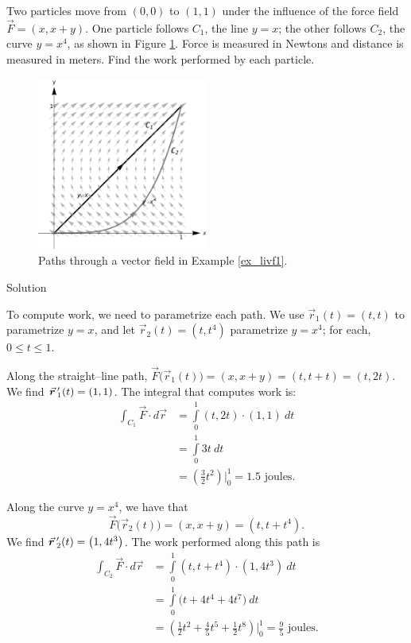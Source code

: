 \begin{example}\label{ex_livf1}
Two particles move from $(0,0)$ to $(1,1)$ under the influence of the force field $\vec F  = \left( x, x+y\right)$. One particle follows $C_1$, the line $y=x$; the other follows $C_2$, the curve $y=x^4$, as shown in Figure \ref{fig_Vector_Calc_8}. Force is measured in Newtons and distance is measured in meters. Find the work performed by each particle.


\begin{figure}[H]
	\begin{center}
			\includegraphics[width=0.5\textwidth]{fig_Vector_Calc_8}
	\caption{Paths through a vector field in Example \ref{ex_livf1}.}
	\label{fig_Vector_Calc_8}
	\end{center}
\end{figure}


Solution 

To compute work, we need to parametrize each path. We use $\vec r_1(t) = \left( t,t\right)$ to parametrize $y=x$, and let $\vec r_2(t) =\left( t,t^4\right)$ parametrize $y=x^4$; for each, $0\leq t\leq 1$. 

Along the straight--line path, $\vec F\big(\vec r_1(t)\big) = \left( x, x+y\right) = \left( t, t+t\right) = \left( t,2t\right)$. We find $\vrp_1(t) =\left( 1,1\right)$. The integral that computes work is:
\begin{align*}
\int_{C_1} \vec F\cdot d\vec r &= \int\limits_0^1 \left( t,2t\right)\cdot\left( 1,1\right)\ dt \\
			&= \int\limits_0^1 3t\ dt \\
			&= \left(\frac32t^2\right)\Bigg|_0^1 = 1.5 \text{ joules}.
\end{align*}

Along the curve $y = x^4$, we have that
$$\vec F\big(\vec r_2(t)\big) = \left( x, x+y\right) = \left( t, t+t^4\right).$$ We find $\vrp_2(t) = \left( 1,4t^3\right)$. The work performed along this path is
\begin{align*}
\int_{C_2} \vec F\cdot d\vec r &= \int\limits_0^1 \left( t,t+t^4\right)\cdot\left( 1,4t^3\right)\ dt\\
			&= \int\limits_0^1 \big(t + 4t^4+ 4t^7\big)\ dt \\
			&= \left(\frac12t^2 + \frac45t^5 + \frac12t^8\right)\Bigg|_0^1 =  \frac95 \text{ joules}.
\end{align*}



\end{example}

